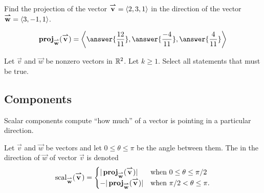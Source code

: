 \documentclass{ximera}
\begin{document}
\begin{question}
  Find the projection of the vector ${\overset{\boldsymbol{\rightharpoonup}}{\mathbf{v}}} = \left\langle 2,3,1\right\rangle$ in the
  direction of the vector ${\overset{\boldsymbol{\rightharpoonup}}{\mathbf{w}}} = \left\langle 3,-1,1\right\rangle$.
  \begin{prompt}
  \[
  \proj_\vec{w}(\vec{v}) = \vector{\answer{\frac{12}{11}},\answer{\frac{-4}{11}},\answer{\frac{4}{11}}}
  \]
  \end{prompt}
\end{question}

\begin{question}
  Let $\vec{v}$ and $\vec{w}$ be nonzero vectors in $\mathbb R^2$. Let $k\ge
  1$. Select all statements that must be true.
  \begin{selectAll}
  \end{selectAll}
\end{question}


\subsection{Components}
Scalar components compute ``how much'' of a vector is pointing in a
particular direction.
\begin{definition}
  Let $\vec{v}$ and $\vec{w}$ be vectors and let $0\le\theta\le\pi$ be
  the angle between them.  The 
  in the direction of $\vec{w}$ of vector $\vec{v}$ is denoted
  \[
  \operatorname{scal}_{\overset{\boldsymbol{\rightharpoonup}}{\mathbf{w}}}({\overset{\boldsymbol{\rightharpoonup}}{\mathbf{v}}})=
  \begin{cases}
    |\operatorname{\mathbf{proj}}_{\overset{\boldsymbol{\rightharpoonup}}{\mathbf{w}}}({\overset{\boldsymbol{\rightharpoonup}}{\mathbf{v}}})| &\text{when $0\le\theta\le \pi/2$}\\
    -|\operatorname{\mathbf{proj}}_{\overset{\boldsymbol{\rightharpoonup}}{\mathbf{w}}}({\overset{\boldsymbol{\rightharpoonup}}{\mathbf{v}}})| &\text{when $\pi/2<\theta\le \pi$.}
  \end{cases}
  \]
\end{definition}
\end{document}
